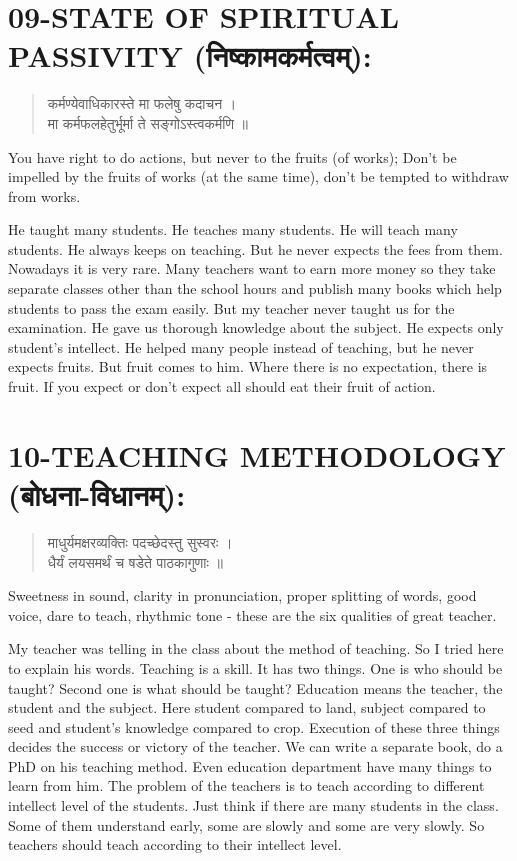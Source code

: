 \section*{09-STATE OF SPIRITUAL PASSIVITY (निष्कामकर्मत्वम्):}
\begin{verse}
कर्मण्येवाधिकारस्ते मा फलेषु कदाचन ।\\
मा कर्मफलहेतुर्भूर्मा ते सङ्गोऽस्त्वकर्मणि ॥
\end{verse}
You have right to do actions, but never to the fruits (of works); Don’t be impelled by the fruits of works (at the same time), don’t be tempted to withdraw from works.

He taught many students. He teaches many students. He will teach many students. He always keeps on teaching. But he never expects the fees from them. Nowadays it is very rare. Many teachers want to earn more money so they take separate classes other than the school hours and publish many books which help students to pass the exam easily. But my teacher never taught us for the examination. He gave us thorough knowledge about the subject. He expects only student’s intellect. He helped many people instead of teaching, but he never expects fruits. But fruit comes to him. Where there is no expectation, there is fruit. If you expect or don’t expect all should eat their fruit of action.

\section*{10-TEACHING METHODOLOGY (बोधना-विधानम्):}
\begin{verse}
माधुर्यमक्षरव्यक्तिः पदच्छेदस्तु सुस्वरः ।\\
धैर्यं लयसमर्थं च षडेते पाठकागुणाः ॥
\end{verse}
Sweetness in sound, clarity in pronunciation, proper splitting of words, good voice, dare to teach, rhythmic tone -  these are the six qualities of great teacher.

My teacher was telling in the class about the method of teaching. So I tried here to explain his words. Teaching is a skill. It has two things. One is who should be taught? Second one is what should be taught? Education means the teacher, the student and the subject. Here student compared to land, subject compared to seed and student’s knowledge compared to crop. Execution of these three things decides the success or victory of the teacher. We can write a separate book, do a PhD on his teaching method. Even education department have many things to learn from him. The problem of the teachers is to teach according to different intellect level of the students. Just think if there are many students in the class. Some of them understand early, some are slowly and some are very slowly. So teachers should teach according to their intellect level.

